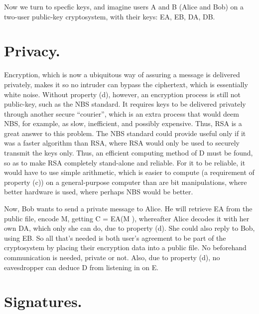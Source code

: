 \documentclass{article}
\begin{document}
Now we turn to specfic keys, and imagine users A and B (Alice and Bob) on a two-user public-key cryptosystem, with their keys: EA, EB, DA, DB.

\section{Privacy.}


Encryption, which is now a ubiquitous way of assuring a message is delivered privately, makes it so no intruder can bypass the ciphertext, which is essentially white noise. Without property (d), however, an encryption process is still not public-key, such as the NBS standard. It requires keys to be delivered privately through another secure “courier”, which is an extra process that would deem NBS, for example, as slow, inefficient, and possibly expensive. Thus, RSA is a great answer to this problem. The NBS standard could provide useful only if it was a faster algorithm than RSA, where RSA would only be used to securely transmit the keys only. Thus, an efficient computing method of D must be found, so as to make RSA completely stand-alone and reliable. For it to be reliable, it would have to use simple arithmetic, which is easier to compute (a requirement of property (c)) on a general-purpose computer than are bit manipulations, where better hardware is used, where perhaps NBS would be better. 
\\\par\setlength\parindent{2em}

Now, Bob wants to send a private message to Alice. He will retrieve EA from the public file, encode M, getting C = EA(M ), whereafter Alice decodes it with her own DA, which only she can do, due to property (d). She could also reply to Bob, using EB. So all that’s needed is both user’s agreement to be part of the cryptosystem by placing their encryption data into a public file. No beforehand communication is needed, private or not. Also, due to property (d), no eavesdropper can deduce D from listening in on E. 

\section{Signatures.}
\end{document}
